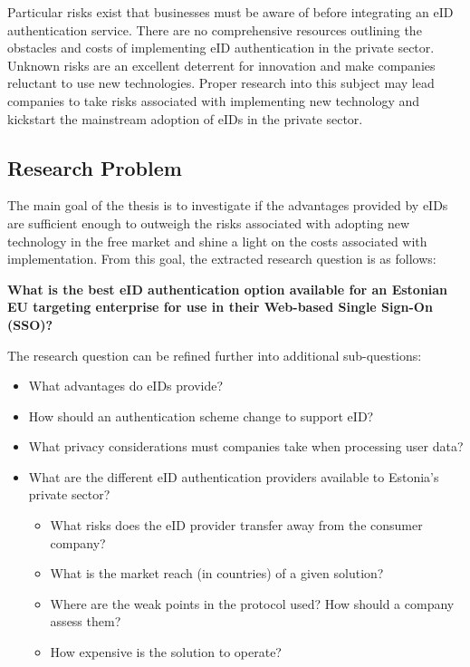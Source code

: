 Particular risks exist that businesses must be aware of before integrating an eID authentication service. There are no comprehensive resources outlining the obstacles and costs of implementing eID authentication in the private sector. Unknown risks are an excellent deterrent for innovation and make companies reluctant to use new technologies. Proper research into this subject may lead companies to take risks associated with implementing new technology and kickstart the mainstream adoption of eIDs in the private sector. 

\subsection{Research Problem}

The main goal of the thesis is to investigate if the advantages provided by eIDs are sufficient enough to outweigh the risks associated with adopting new technology in the free market and shine a light on the costs associated with implementation. From this goal, the extracted research question is as follows: 

\textbf{What is the best eID authentication option available for an Estonian EU targeting enterprise for use in their Web-based Single Sign-On (SSO)?}

The research question can be refined further into additional sub-questions:

\begin{itemize}
    \item What advantages do eIDs provide?
    \item How should an authentication scheme change to support eID?
    \item What privacy considerations must companies take when processing user data?
    \item What are the different eID authentication providers available to Estonia's private sector?
    \begin{itemize}
        \item What risks does the eID provider transfer away from the consumer company?
        \item What is the market reach (in countries) of a given solution?
        \item Where are the weak points in the protocol used? How should a company assess them?
        \item How expensive is the solution to operate?
    \end{itemize}
\end{itemize}

